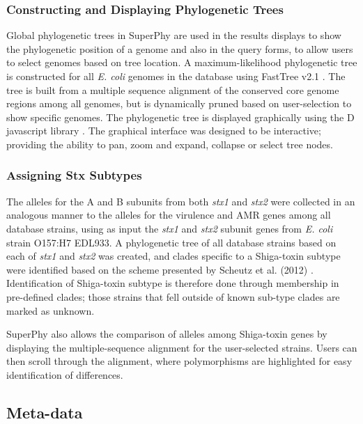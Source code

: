 \documentclass[a4paper,twoside]{article}
\begin{document}
\subsubsection{Constructing and Displaying Phylogenetic Trees}

Global phylogenetic trees in SuperPhy are used in the results displays to show the phylogenetic position of a genome and also in the query forms, to allow users to select genomes based on tree location. A maximum-likelihood phylogenetic tree is constructed for all \textit{E. coli} genomes in the database using FastTree v2.1 \cite{price_fasttree_2010}. The tree is built from a multiple sequence alignment of the conserved core genome regions among all genomes, but is dynamically pruned based on user-selection to show specific genomes. The phylogenetic tree is displayed graphically using the D javascript library \cite{bostock2011d3}. The graphical interface was designed to be interactive; providing the ability to pan, zoom and expand, collapse or select tree nodes.

\subsubsection{Assigning Stx Subtypes}

The alleles for the A and B subunits from both \textit{stx1} and \textit{stx2} were collected in an analogous manner to the alleles for the virulence and AMR genes among all database strains, using as input the \textit{stx1} and \textit{stx2} subunit genes from \textit{E. coli} strain O157:H7 EDL933. A phylogenetic tree of all database strains based on each of \textit{stx1} and \textit{stx2} was created, and clades specific to a Shiga-toxin subtype were identified based on the scheme presented by Scheutz et al. (2012) \cite{scheutz_multicenter_2012}. Identification of Shiga-toxin subtype is therefore done through membership in pre-defined clades; those strains that fell outside of known sub-type clades are marked as unknown.

SuperPhy also allows the comparison of alleles among Shiga-toxin genes by displaying the multiple-sequence alignment for the user-selected strains. Users can then scroll through the alignment, where polymorphisms are highlighted for easy identification of differences.

\subsection{Meta-data}
\end{document}
